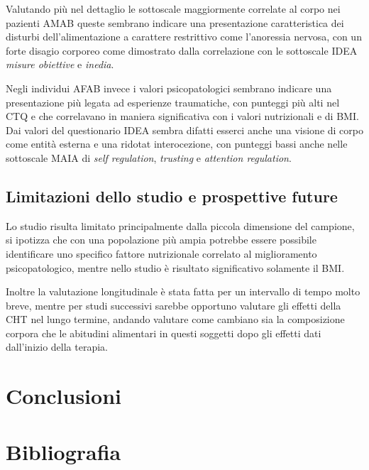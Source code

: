 \documentclass[12pt]{article}
\begin{document}
Valutando più nel dettaglio le sottoscale maggiormente correlate al corpo nei pazienti AMAB queste sembrano indicare una presentazione caratteristica dei disturbi dell'alimentazione a carattere restrittivo come l'anoressia nervosa, con un forte disagio corporeo come dimostrato dalla correlazione con le sottoscale IDEA \emph{misure obiettive} e \emph{inedia}.

Negli individui AFAB invece i valori psicopatologici sembrano indicare una presentazione più legata ad esperienze traumatiche, con punteggi più alti nel CTQ e che correlavano in maniera significativa con i valori nutrizionali e di BMI.
Dai valori del questionario IDEA sembra difatti esserci anche una visione di corpo come entità esterna e una ridotat interocezione, con punteggi bassi anche nelle sottoscale MAIA di \emph{self regulation}, \emph{trusting} e \emph{attention regulation}.
\subsection{Limitazioni dello studio e prospettive future}
\label{sec:org8dedca7}
Lo studio risulta limitato principalmente dalla piccola dimensione del campione, si ipotizza che con una popolazione più ampia potrebbe essere possibile identificare uno specifico fattore nutrizionale correlato al miglioramento psicopatologico, mentre nello studio è risultato significativo solamente il BMI.

Inoltre la valutazione longitudinale è stata fatta per un intervallo di tempo molto breve, mentre per studi successivi sarebbe opportuno valutare gli effetti della CHT nel lungo termine, andando valutare come cambiano sia la composizione corpora che le abitudini alimentari in questi soggetti dopo gli effetti dati dall'inizio della terapia.
\section{Conclusioni}
\label{sec:org7e5495d}


\section{Bibliografia}
\label{sec:orgf1860c9}
\end{document}
